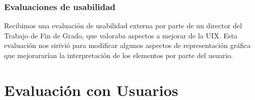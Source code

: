\subsubsection{Evaluaciones de usabilidad}

Recibimos una evaluación de usabilidad externa por parte de un director del Trabajo de Fin de Grado, que valoraba aspectos a mejorar de la UIX. Esta evaluación nos sirivió para modificar algunos aspectos de representación gráfica que mejorararían la interpretación de los elementos por parte del usuario.

\section{Evaluación con Usuarios}